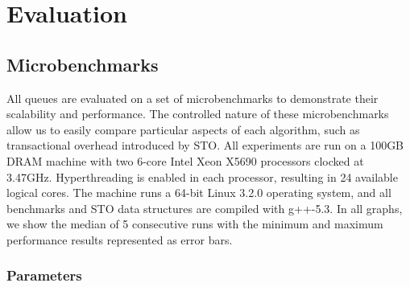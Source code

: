 \section{Evaluation}

\subsection{Microbenchmarks}
\label{q_microbenchmarks}

All queues are evaluated on a set of microbenchmarks to demonstrate their scalability and performance. The controlled nature of these microbenchmarks allow us to easily compare particular aspects of each algorithm, such as transactional overhead introduced by STO. All experiments are run on a 100GB DRAM machine with two 6-core Intel Xeon X5690 processors clocked at 3.47GHz. Hyperthreading is enabled in each processor, resulting in 24 available logical cores. The machine runs a 64-bit Linux 3.2.0 operating system, and all benchmarks and STO data structures are compiled with g++-5.3. In all graphs, we show the median of 5 consecutive runs with the minimum and maximum performance results represented as error bars.

\subsubsection{Parameters}

